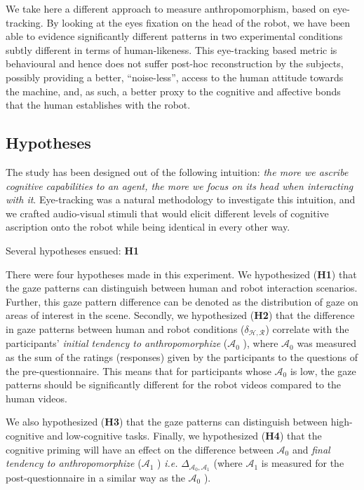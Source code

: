 \documentclass[lettersize, noapacite, twoside, HRI]{apa_HRI}
\newcommand{\ie}{\textit{i.e.}\xspace}
\newcommand{\h}[1]{\textbf{H#1}\xspace}
\newcommand{\anti}{{$\mathcal{A}_0$ }}
\newcommand{\antf}{{$\mathcal{A}_1$ }}
\newcommand{\deltaant}{{ $\Delta_{\mathcal{A}_0,\mathcal{A}_1}$ }}
\begin{document}
We take here a different approach to measure anthropomorphism, based on
eye-tracking.  By looking at the eyes fixation on the head of the robot, we have
been able to evidence significantly different patterns in two experimental
conditions subtly different in terms of human-likeness. This eye-tracking based
metric is behavioural and hence does not suffer post-hoc reconstruction by the
subjects, possibly providing a better, ``noise-less'', access to the human
attitude towards the machine, and, as such, a better proxy to the cognitive and
affective bonds that the human establishes with the robot.


\subsection{Hypotheses}

The study has been designed out of the following intuition: \emph{the more we
ascribe cognitive capabilities to an agent, the more we focus on its head when
interacting with it}.  Eye-tracking was a natural methodology to investigate
this intuition, and we crafted audio-visual stimuli that would elicit different
levels of cognitive ascription onto the robot while being identical in every
other way.

Several hypotheses ensued: \h{1}

There were four hypotheses made in this experiment. We hypothesized (\textbf{H1}) that the gaze patterns can
distinguish between human and robot interaction scenarios. Further, this gaze
pattern difference can be denoted as the distribution of gaze on areas of
interest in the scene.  Secondly, we hypothesized (\textbf{H2}) that the
difference in gaze patterns between human and robot conditions
($\delta_{\mathcal{H},\mathcal{R}}$) correlate with the participants'
\textit{initial tendency to anthropomorphize} (\anti), where \anti was measured
as the sum of the ratings (responses) given by the participants to the questions
of the pre-questionnaire. This means that for participants whose \anti is low,
the gaze patterns should be significantly different for the robot videos
compared to the human videos.

We also hypothesized (\textbf{H3}) that the gaze patterns can distinguish
between high-cognitive and low-cognitive tasks. Finally, we hypothesized
(\textbf{H4}) that the cognitive priming will have an effect on the difference
between \anti and \textit{final tendency to anthropomorphize} (\antf) \ie
\deltaant (where \antf is measured for the post-questionnaire in a similar way
as the \anti).
\end{document}
